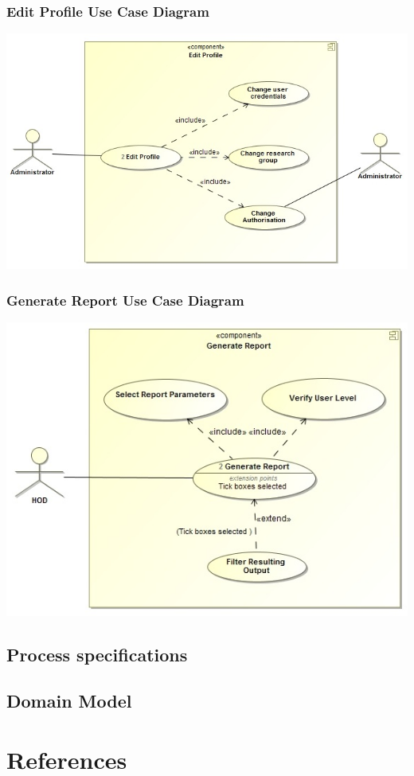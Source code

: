 \documentclass[a4paper,12pt]{article}
\begin{document}
	\subsubsection{Edit Profile Use Case Diagram}
	\includegraphics[width=1\textwidth]{./EditProfile.jpg}\\[1.5cm]
	
	\subsubsection{Generate Report Use Case Diagram}
	\includegraphics[width=1\textwidth]{./GenerateReport.jpg}\\[1.5cm]
		
\subsection{Process specifications}
\subsection{Domain Model}

\newpage
\section{References}
\end{document}

